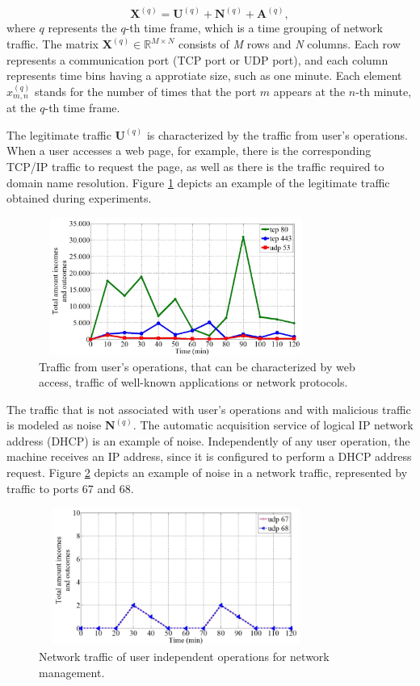 \documentclass[review]{elsarticle}
\begin{document}
\begin{equation}\label{eq:eq01}
\boldsymbol{X}^{(q)} = \boldsymbol{U}^{(q)} + \boldsymbol{N}^{(q)} + \boldsymbol{A}^{(q)},
\end{equation}
where $q$ represents the $q$-th time frame, which is a time grouping of network traffic. The matrix $\boldsymbol{X}^{(q)} \in \mathbb{R}^{M \times N}$ consists of \emph{M} rows and \emph{N} columns. Each row represents a communication port (TCP port or UDP port), and each column represents time bins having a approtiate size, such as one minute. Each element $x_{m,n}^{(q)}$ stands for the number of times that the port $m$ appears at the $n$-th minute, at the $q$-th time frame.

The legitimate traffic $\boldsymbol{U}^{(q)}$ is characterized by the traffic from user's operations. When a user accesses a web page, for example, there is the corresponding TCP/IP traffic to request the page, as well as there is the traffic required to domain name resolution. Figure \ref{fig:fig3} depicts an example of the legitimate traffic obtained during experiments.

\begin{figure}[h!]
     \centering 
     \includegraphics[height=4.5cm, width=9cm]{results/figures/fig03.png}
     \caption{Traffic from user's operations, that can be characterized by web access, traffic of well-known applications or network protocols.}
     \label{fig:fig3}
\end{figure}

The traffic that is not associated with user's operations and with malicious traffic is modeled as noise $\boldsymbol{N}^{(q)}$. The automatic acquisition service of logical IP network address (DHCP) is an example of noise. Independently of any user operation, the machine receives an IP address, since it is configured to perform a DHCP address request. Figure \ref{fig:fig4} depicts an example of noise in a network traffic, represented by traffic to ports 67 and 68.

\begin{figure}[h!]
     \centering 
     \includegraphics[height=4.5cm, width=9cm]{results/figures/fig04.png}
     \caption{Network traffic of user independent operations for network management.}
     \label{fig:fig4}
\end{figure}
\end{document}

